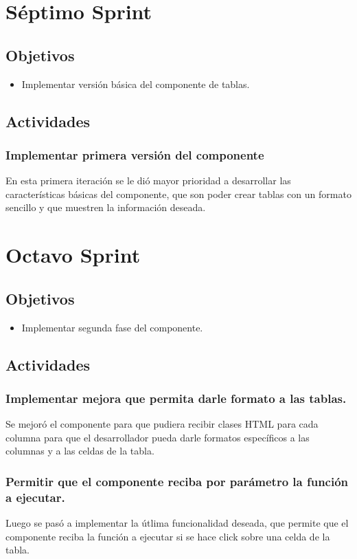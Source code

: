 \section{Séptimo Sprint}

\subsection{Objetivos}
\begin{itemize}
  \item Implementar versión básica del componente de tablas.
\end{itemize}
\subsection{Actividades}
\subsubsection{Implementar primera versión del componente}
En esta primera iteración se le dió mayor prioridad a desarrollar las características
básicas del componente, que son poder crear tablas con un formato sencillo y que muestren
la información deseada.


\section{Octavo Sprint}

\subsection{Objetivos}
\begin{itemize}
  \item Implementar segunda fase del componente.
\end{itemize}
\subsection{Actividades}
\subsubsection{Implementar mejora que permita darle formato a las tablas.}
Se mejoró el componente para que pudiera recibir clases HTML para cada columna
para que el desarrollador pueda darle formatos específicos a las columnas y a las celdas
de la tabla.
\subsubsection{Permitir que el componente reciba por parámetro la función a ejecutar.}
Luego se pasó a implementar la útlima funcionalidad deseada, que permite que el
componente reciba la función a ejecutar si se hace click sobre una celda de la tabla.

